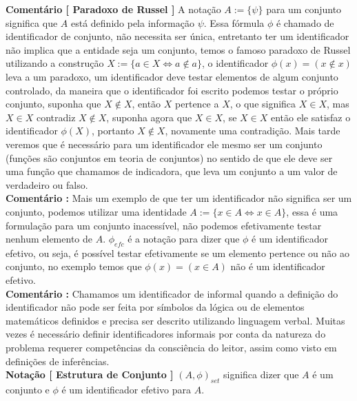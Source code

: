 \documentclass[10pt,a4paper]{report}
\begin{document}
\textbf{Comentário [ Paradoxo de Russel ]} A notação $ A := \{ \psi \} $ para um conjunto significa que $ A $ está definido pela informação $\psi$. Essa fórmula $\phi$ é chamado de identificador de conjunto, não necessita ser única, entretanto ter um identificador não implica que a entidade seja um conjunto, temos o famoso paradoxo de Russel utilizando a construção $ X:= \{ a \in X \iff a \notin a \} $, o identificador $\phi(x) = (x \notin x)$ leva a um paradoxo, um identificador deve testar elementos de algum conjunto controlado, da maneira que o identificador foi escrito podemos testar o próprio conjunto, suponha que $ X \notin X $, então $X$ pertence a $X$, o que significa $X \in X$, mas $ X \in X $ contradiz $X \notin X$, suponha agora que $X \in X$, se $X \in X$ então ele satisfaz o identificador $\phi(X)$, portanto $X \notin X$, novamente uma contradição. Mais tarde veremos que é necessário para um identificador ele mesmo ser um conjunto (funções são conjuntos em teoria de conjuntos) no sentido de que ele deve ser uma função que chamamos de indicadora, que leva um conjunto a um valor de verdadeiro ou falso.\\

\textbf{Comentário :} Mais um exemplo de que ter um identificador não significa ser um conjunto, podemos utilizar uma identidade $ A:= \{ x \in A \iff x \in A \} $, essa é uma formulação para um conjunto inacessível, não podemos efetivamente testar nenhum elemento de $A$. $ \phi_{efc} $ é a notação para dizer que $\phi$ é um identificador efetivo, ou seja, é possível testar efetivamente se um elemento pertence ou não ao conjunto, no exemplo temos que $\phi(x) = (x \in A)$ não é um identificador efetivo. \\

\textbf{Comentário :} Chamamos um identificador de informal quando a definição do identificador não pode ser feita por símbolos da lógica ou de elementos matemáticos definidos e precisa ser descrito utilizando linguagem verbal. Muitas vezes é necessário definir identificadores informais por conta da natureza do problema requerer competências da consciência do leitor, assim como visto em definições de inferências.\\

\textbf{Notação [ Estrutura de Conjunto ]} $ (A,\phi)_{set} $ significa dizer que $A$ é um conjunto e $\phi$ é um identificador efetivo para $A$.

\hspace{\baselineskip}
\end{document}
